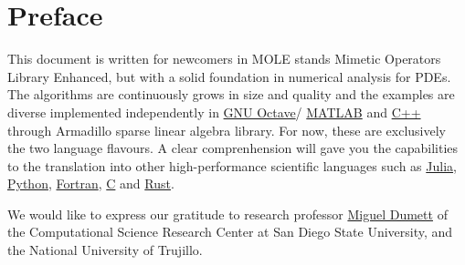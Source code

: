 \chapter*{Preface}

This document is written for newcomers in MOLE stands Mimetic
Operators Library Enhanced, but with a solid foundation in numerical
analysis for PDEs.
The algorithms are continuously grows in size and quality and the
examples are diverse implemented independently in
\href{https://octave.org}{GNU Octave}/
\href{https://www.mathworks.com/products/matlab.html}{MATLAB}
and \href{https://isocpp.org}{C++} through Armadillo sparse linear
algebra library.
For now, these are exclusively the two language flavours.
A clear comprenhension will gave you the capabilities to the
translation into other high-performance scientific languages such as
\href{https://julialang.org}{Julia},
\href{https://www.python.org}{Python},
\href{https://fortran-lang.org}{Fortran},
\href{https://www.open-std.org/jtc1/sc22/wg14}{C} and
\href{https://www.rust-lang.org}{Rust}.

We would like to express our gratitude to research professor
\href{https://ctivitae.concytec.gob.pe/appDirectorioCTI/VerDatosInvestigador.do?id_investigador=45848}{Miguel Dumett}
of the Computational Science Research Center at San Diego State University,
and the National University of Trujillo.

